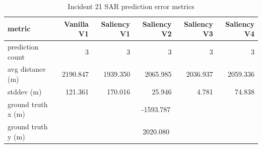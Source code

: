 \begin{table}[ht]
\centering
\caption{Incident 21 SAR prediction error metrics}
\label{tab:sar-incident-21}
\begin{tabular}{lrrrrr}
\hline
metric & Vanilla V1 & Saliency V1 & Saliency V2 & Saliency V3 & Saliency V4 \\
\hline
prediction count & 3 & 3 & 3 & 3 & 3 \\
avg distance (m) & 2190.847 & 1939.350 & 2065.985 & 2036.937 & 2059.336 \\
stddev (m) & 121.361 & 170.016 & 25.946 & 4.781 & 74.838 \\
ground truth x (m) & \multicolumn{5}{c}{-1593.787} \\
ground truth y (m) & \multicolumn{5}{c}{2020.080} \\
\hline
\end{tabular}
\end{table}
